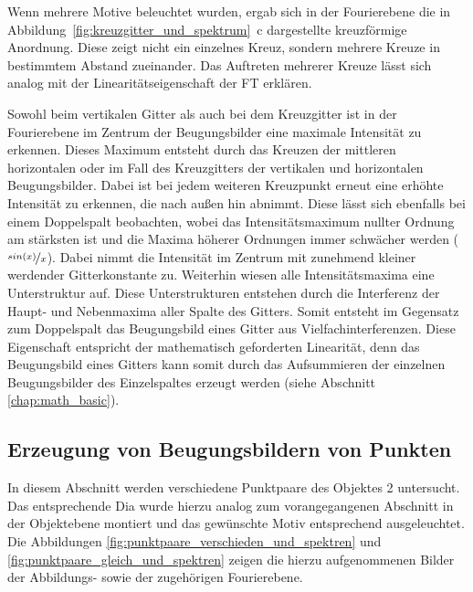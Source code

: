 Wenn mehrere Motive beleuchtet wurden, ergab sich in der Fourierebene die in Abbildung~\ref{fig:kreuzgitter_und_spektrum}~c dargestellte kreuzförmige Anordnung. Diese zeigt nicht ein einzelnes Kreuz, sondern mehrere Kreuze in bestimmtem Abstand zueinander. Das Auftreten mehrerer Kreuze lässt sich analog mit der Linearitätseigenschaft der FT erklären.

Sowohl beim vertikalen Gitter als auch bei dem Kreuzgitter ist in der Fourierebene im Zentrum der Beugungsbilder eine maximale Intensität zu erkennen. Dieses Maximum entsteht durch das Kreuzen der mittleren horizontalen oder im Fall des Kreuzgitters der vertikalen und horizontalen Beugungsbilder. Dabei ist bei jedem weiteren Kreuzpunkt erneut eine erhöhte Intensität zu erkennen, die nach außen hin abnimmt. Diese lässt sich ebenfalls bei einem
Doppelspalt beobachten, wobei das Intensitätsmaximum nullter Ordnung am stärksten ist und die Maxima höherer Ordnungen immer schwächer werden ($\nicefrac{sin(x)}{x}$). Dabei nimmt die Intensität im Zentrum mit zunehmend kleiner werdender Gitterkonstante zu.
Weiterhin wiesen alle Intensitätsmaxima eine Unterstruktur auf. Diese Unterstrukturen entstehen durch die Interferenz der Haupt- und Nebenmaxima aller Spalte des Gitters. Somit entsteht im Gegensatz zum Doppelspalt das Beugungsbild eines Gitter aus Vielfachinterferenzen. Diese Eigenschaft entspricht der mathematisch geforderten Linearität, denn das Beugungsbild eines Gitters kann somit durch das Aufsummieren der einzelnen Beugungsbilder des Einzelspaltes erzeugt werden (siehe Abschnitt \ref{chap:math_basic}).


\subsection{Erzeugung von Beugungsbildern von Punkten}

In diesem Abschnitt werden verschiedene Punktpaare des Objektes 2 untersucht. Das entsprechende Dia wurde hierzu analog zum vorangegangenen Abschnitt in der Objektebene montiert und das gewünschte Motiv entsprechend ausgeleuchtet. Die Abbildungen \ref{fig:punktpaare_verschieden_und_spektren} und \ref{fig:punktpaare_gleich_und_spektren} zeigen die hierzu aufgenommenen Bilder der Abbildungs- sowie der zugehörigen Fourierebene. 

